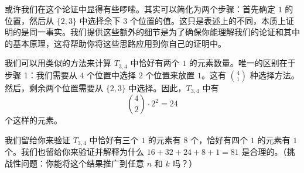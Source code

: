 \begin{example}
    或许我们在这个论证中显得有些啰嗦。其实可以简化为两个步骤：首先确定 $1$ 的位置，然后从 $\{2, 3\}$ 中选择余下 $3$ 个位置的值。这只是表述上的不同，本质上证明的是同一事实。我们提供这些额外的细节是为了确保你能理解我们的论证和其中的基本原理，这将帮助你将这些思路应用到你自己的证明中。

    我们可以用类似的方法来计算 $T_{3,4}$ 中恰好有两个 $1$ 的元素数量。唯一的区别在于步骤 1：我们需要从 $4$ 个位置中选择 $2$ 个位置来放置 $1$。这有 ${4 \choose 1}$ 种选择方法。然后，剩余两个位置需要从 $\{2, 3\}$ 中选择。因此，$T_{3,4}$ 中有
    \[{4 \choose 2} \cdot 2^2 = 24\]
    个这样的元素。

    我们留给你来验证 $T_{3,4}$ 中恰好有三个 $1$ 的元素有 $8$ 个，恰好有四个 $1$ 的元素有 $1$ 个。我们也留给你来验证并解释为什么 $16 + 32 + 24 + 8 + 1 = 81$ 是合理的。（挑战性问题：你能将这个结果推广到任意 $n$ 和 $k$ 吗？）
\end{example}

